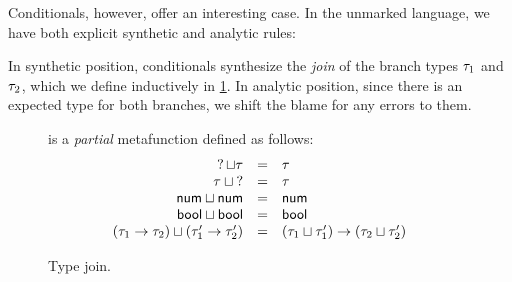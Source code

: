 Conditionals, however, offer an interesting case. In the unmarked language, we have both explicit
synthetic and analytic rules:
%
\begin{mathpar}

\end{mathpar}
%
In synthetic position, conditionals synthesize the \emph{join} of the branch types $\TMV_1$ and
$\TMV_2$, which we define inductively in \cref{fig:calculus-type-join}. In analytic position, since
there is an expected type for both branches, we shift the blame for any errors to them.


\newcommand{\joinsTo}[3]{\ensuremath{\TJoin{#1}{#2} & = & #3}}
\begin{figure}[htbp]
  \raggedright
   is a \emph{partial} metafunction defined as follows:
  \[\begin{array}{rcl}
    \joinsTo{\TUnknown}{\TMV}{\TMV} \\
    \joinsTo{\TMV}{\TUnknown}{\TMV} \\
    \joinsTo{\TNum}{\TNum}{\TNum} \\
    \joinsTo{\TBool}{\TBool}{\TBool} \\
    \joinsTo{(\TArrow{\TMV_1}{\TMV_2})}{(\TArrow{\TMV_1'}{\TMV_2'})}{\TArrow{(\TJoin{\TMV_1}{\TMV_1'})}{(\TJoin{\TMV_2}{\TMV_2'})}} \\
  \end{array}\]
  \caption{Type join.}
  \label{fig:calculus-type-join}
\end{figure}

